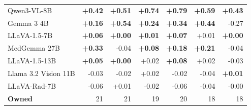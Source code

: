 \begin{table}[t]
{\begin{tabular}{lrrrrrr}
Qwen3-VL-8B & \cellcolor{cfTerra4}\textbf{+0.42} & \cellcolor{cfTerra4}\textbf{+0.51} & \cellcolor{cfTerra4}\textbf{+0.74} & \cellcolor{cfTerra4}\textbf{+0.79} & \cellcolor{cfTerra4}\textbf{+0.59} & \cellcolor{cfTerra4}\textbf{+0.43} \\
Gemma 3 4B & \cellcolor{cfTerra3}\textbf{+0.16} & \cellcolor{cfTerra4}\textbf{+0.54} & \cellcolor{cfTerra3}\textbf{+0.24} & \cellcolor{cfTerra4}\textbf{+0.34} & \cellcolor{cfTerra4}\textbf{+0.44} & \cellcolor{cfSlate4}-0.27 \\
LLaVA-1.5-7B & \cellcolor{cfTerra2}\textbf{+0.06} & \cellcolor{cfTerra1}\textbf{+0.00} & \cellcolor{cfTerra1}\textbf{+0.01} & \cellcolor{cfTerra2}\textbf{+0.07} & \cellcolor{cfTerra1}+0.01 & \cellcolor{cfTerra1}\textbf{+0.00} \\
MedGemma 27B & \cellcolor{cfTerra4}\textbf{+0.33} & \cellcolor{cfSlate2}-0.04 & \cellcolor{cfTerra2}\textbf{+0.08} & \cellcolor{cfTerra3}\textbf{+0.18} & \cellcolor{cfTerra3}\textbf{+0.21} & \cellcolor{cfSlate2}-0.04 \\
LLaVA-1.5-13B & \cellcolor{cfTerra2}\textbf{+0.05} & \cellcolor{cfTerra1}\textbf{+0.00} & \cellcolor{cfTerra1}+0.02 & \cellcolor{cfTerra2}\textbf{+0.08} & \cellcolor{cfTerra1}+0.02 & \cellcolor{cfSlate2}-0.03 \\
Llama 3.2 Vision 11B & \cellcolor{cfSlate2}-0.03 & \cellcolor{cfSlate2}-0.02 & \cellcolor{cfTerra2}+0.02 & \cellcolor{cfSlate1}-0.02 & \cellcolor{cfSlate2}-0.04 & \cellcolor{cfTerra1}\textbf{+0.01} \\
LLaVA-Rad-7B & \cellcolor{cfSlate2}-0.06 & \cellcolor{cfTerra1}+0.01 & \cellcolor{cfSlate2}-0.02 & \cellcolor{cfSlate2}-0.06 & \cellcolor{cfSlate2}-0.04 & \cellcolor{cfSlate1}-0.00 \\
\midrule
\textbf{Owned} & 21 & 21 & 19 & 20 & 18 & 18 \\
\bottomrule
\end{tabular}}
\end{table}
